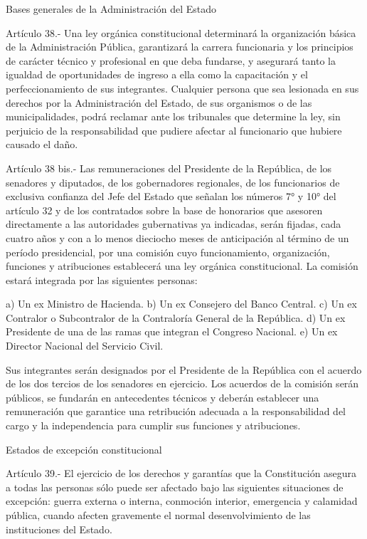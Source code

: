     Bases generales de la Administración del Estado



    Artículo 38.- Una ley orgánica constitucional determinará la organización básica de la Administración Pública, garantizará la carrera funcionaria y los principios de carácter técnico y profesional en que deba fundarse, y asegurará tanto la igualdad de oportunidades de ingreso a ella como la capacitación y el perfeccionamiento de sus integrantes.
    Cualquier persona que sea lesionada en sus derechos por la Administración del Estado, de sus organismos o de las municipalidades, podrá reclamar ante los tribunales que determine la ley, sin perjuicio de la responsabilidad que pudiere afectar al funcionario que hubiere causado el daño.


    Artículo 38 bis.- Las remuneraciones del Presidente de la República, de los senadores y diputados, de los gobernadores regionales, de los funcionarios de exclusiva confianza del Jefe del Estado que señalan los números 7° y 10° del artículo 32 y de los contratados sobre la base de honorarios que asesoren directamente a las autoridades gubernativas ya indicadas, serán fijadas, cada cuatro años y con a lo menos dieciocho meses de anticipación al término de un período presidencial, por una comisión cuyo funcionamiento, organización, funciones y atribuciones establecerá una ley orgánica constitucional.
    La comisión estará integrada por las siguientes personas:

    a) Un ex Ministro de Hacienda.
    b) Un ex Consejero del Banco Central.
    c) Un ex Contralor o Subcontralor de la Contraloría General de la República.
    d) Un ex Presidente de una de las ramas que integran el Congreso Nacional.
    e) Un ex Director Nacional del Servicio Civil.

    Sus integrantes serán designados por el Presidente de la República con el acuerdo de los dos tercios de los senadores en ejercicio.
    Los acuerdos de la comisión serán públicos, se fundarán en antecedentes técnicos y deberán establecer una remuneración que garantice una retribución adecuada a la responsabilidad del cargo y la independencia para cumplir sus funciones y atribuciones.

    Estados de excepción constitucional



    Artículo 39.- El ejercicio de los derechos y garantías que la Constitución asegura a todas las personas sólo puede ser afectado bajo las siguientes situaciones de excepción: guerra externa o interna, conmoción interior, emergencia y calamidad pública, cuando afecten gravemente el normal desenvolvimiento de las instituciones del Estado.


